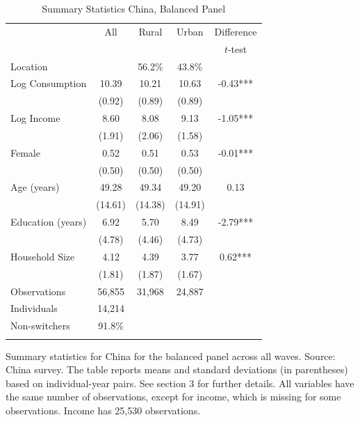 \begin{table}[htbp] \centering \caption{Summary Statistics China, Balanced Panel}\label{tab:summary_stats_CHN_bal} \begin{threeparttable} \begin{tabular}{l cccc} \toprule
& All & Rural & Urban & Difference \\
 &  &  &  & $t$-test \\
\midrule
Location &  &   56.2\% &   43.8\% &  \\  \addlinespace \addlinespace
Log Consumption & 10.39 & 10.21 & 10.63 & -0.43*** \\
 & (0.92) & (0.89) & (0.89) &  \\  \addlinespace
Log Income & 8.60 & 8.08 & 9.13 & -1.05*** \\
 & (1.91) & (2.06) & (1.58) &  \\  \addlinespace
Female & 0.52 & 0.51 & 0.53 & -0.01*** \\
 & (0.50) & (0.50) & (0.50) &  \\  \addlinespace
Age (years) & 49.28 & 49.34 & 49.20 & 0.13 \\
 & (14.61) & (14.38) & (14.91) &  \\  \addlinespace
Education (years) & 6.92 & 5.70 & 8.49 & -2.79*** \\
 & (4.78) & (4.46) & (4.73) &  \\  \addlinespace
Household Size & 4.12 & 4.39 & 3.77 & 0.62*** \\
 & (1.81) & (1.87) & (1.67) &  \\  \addlinespace


\cmidrule{2-5}
Observations & 56,855 & 31,968 & 24,887 &  \\  
Individuals & 14,214 &  &  &  \\
Non-switchers &   91.8\% &  &  &  \\  \addlinespace
\bottomrule \end{tabular} \begin{tablenotes}[flushleft] \footnotesize \item{Summary statistics for China for the balanced panel across all waves. Source: China survey. The table reports means and standard deviations (in parentheses) based on individual-year pairs. See section 3 for further details. All variables have the same number of observations, except for income, which is missing for some observations. Income has 25,530 observations.} \end{tablenotes} \end{threeparttable} \end{table}